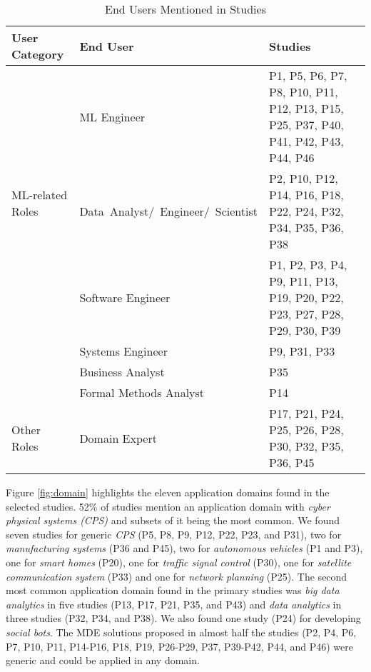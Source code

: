 \begin{table}[htbp]
\centering
    \caption{End Users Mentioned in Studies}
    \label{table:users}
    \footnotesize
        \begin{tabular}{p{3.5cm} p{5cm} p{6.5cm}}
        \hline
        \textbf{User Category} & \textbf{End User} & \textbf{Studies} \TBstrut \\
            \hline
            \multirow{3}{*}{ML-related Roles}  & \multicolumn{1}{p{4.5cm}}{ML Engineer} & \multicolumn{1}{p{6.5cm}}{P1, P5, P6, P7, P8, P10, P11, P12, P13, P15, P25, P37, P40, P41, P42, P43, P44, P46} \TBstrut\\
                                                & \multicolumn{1}{p{4.5cm}}{\mbox{Data Analyst/ Engineer/ Scientist}} & \multicolumn{1}{p{6.5cm}}{P2, P10, P12, P14, P16, P18, P22, P24, P32, P34, P35, P36, P38} \TBstrut\\
            \hline
            
            \multirow{6}{*}{Software \& Systems Roles}  & \multicolumn{1}{p{4.5cm}}{Software Engineer} & \multicolumn{1}{p{6.5cm}}{P1, P2, P3, P4, P9, P11, P13, P19, P20, P22, P23, P27, P28, P29, P30, P39} \TBstrut\\
                                                & \multicolumn{1}{p{4.5cm}}{Systems Engineer} & \multicolumn{1}{p{6.5cm}}{P9, P31, P33} \TBstrut\\
                                                & \multicolumn{1}{p{4.5cm}}{Business Analyst} & \multicolumn{1}{p{6.5cm}}{P35} \TBstrut\\
                                                & \multicolumn{1}{p{4.5cm}}{Formal Methods Analyst} & \multicolumn{1}{p{6.5cm}}{P14} \TBstrut\\
            \hline
            \multirow{2}{*}{Other Roles}  & \multicolumn{1}{p{4.5cm}}{Domain Expert} & \multicolumn{1}{p{6.5cm}}{P17, P21, P24, P25, P26, P28, P30, P32, P35, P36, P45} \TBstrut\\
            \hline
        \end{tabular}
\end{table}

Figure \ref{fig:domain} highlights the eleven application domains found in the selected studies. 52\% of studies mention an application domain with \textit{cyber physical systems (CPS)} and subsets of it being the most common. We found seven studies for generic \textit{CPS} (P5, P8, P9, P12, P22, P23, and P31), two for \textit{manufacturing systems} (P36 and P45), two for \textit{autonomous vehicles} (P1 and P3), one for \textit{smart homes} (P20), one for \textit{traffic signal control} (P30), one for \textit{satellite communication system} (P33) and one for \textit{network planning} (P25). The second most common application domain found in the primary studies was \textit{big data analytics} in five studies (P13, P17, P21, P35, and P43) and \textit{data analytics} in three studies (P32, P34, and P38). We also found one study (P24) for developing \textit{social bots}. The MDE solutions proposed in almost half the studies (P2, P4, P6, P7, P10, P11, P14-P16, P18, P19, P26-P29, P37, P39-P42, P44, and P46) were generic and could be applied in any domain.


